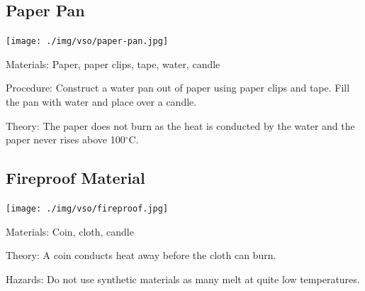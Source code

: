 \begin{multicols}{2}
\subsection{Paper Pan}

\begin{center}
\texttt{[image: ./img/vso/paper-pan.jpg]}
\end{center}

\begin{description*}
\item[Materials:]{Paper, paper clips, tape, water, candle}
\item[Procedure:]{Construct a water pan out of paper using paper clips and tape. Fill the pan with water and place over a candle.}
\item[Theory:]{The paper does not burn as the heat is conducted by the water and the paper never rises above 100$^\circ$C.}
\end{description*}

\subsection{Fireproof Material}

\begin{center}
\texttt{[image: ./img/vso/fireproof.jpg]}
\end{center}

\begin{description*}
\item[Materials:]{Coin, cloth, candle}
\item[Theory:]{A coin conducts heat away before the cloth can burn.}
\item[Hazards:]{Do not use synthetic materials as many melt at quite low temperatures.}
\end{description*}


\end{multicols}
